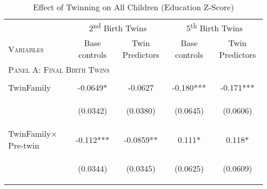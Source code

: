 \documentclass{article}[11pt,subeqn]
\begin{document}
\begin{spacing}{1.5}
\begin{table}									
\caption{Effect of Twinning on All Children (Education Z-Score)}									
\vspace{-3mm}									
\label{tab:RZall}									
\begin{center}									
\begin{tabular}{lcccc} \toprule									
& \multicolumn{2}{c}{2\textsuperscript{nd} Birth Twins} & \multicolumn{2}{c}{5\textsuperscript{th} Birth Twins} \\ \cmidrule(r){2-3} \cmidrule(r){4-5}									
\textsc{Variables}	&	Base controls	&	Twin Predictors	&	Base controls	&	Twin Predictors	\\ \midrule
\multicolumn{5}{l}{\textsc{Panel A: Final Birth Twins}} \\
\begin{footnotesize}\end{footnotesize}&\begin{footnotesize}\end{footnotesize}&\begin{footnotesize}\end{footnotesize}&\begin{footnotesize}\end{footnotesize}&\begin{footnotesize}\end{footnotesize}\\									
TwinFamily	&	-0.0649*	&	-0.0627	&	-0.180***	&	-0.171***	\\   
\vspace{4pt}	& \begin{footnotesize}	(0.0342)	\end{footnotesize} & \begin{footnotesize}	(0.0380)	\end{footnotesize} & \begin{footnotesize}	(0.0645)	\end{footnotesize} & \begin{footnotesize}	(0.0606)	\end{footnotesize} \\
TwinFamily$\times$Pre-twin \ \ \	&	-0.112***	&	-0.0859**	&	0.111*	&	0.118*	\\   
\vspace{4pt}	& \begin{footnotesize}	(0.0344)	\end{footnotesize} & \begin{footnotesize}	(0.0345)	\end{footnotesize} & \begin{footnotesize}	(0.0625)	\end{footnotesize} & \begin{footnotesize}	(0.0609)	\end{footnotesize} \\

\end{tabular}
\end{center}
\end{table}
\end{spacing}
\end{document}
